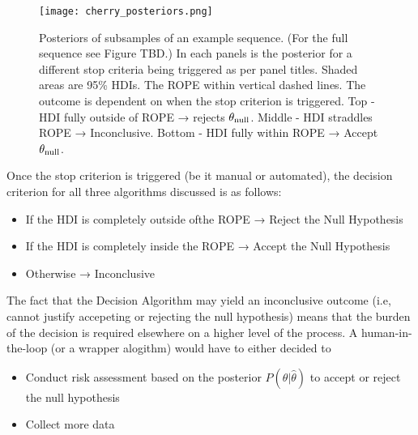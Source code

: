\begin{figure}[h!]
    \centering
    \texttt{[image: cherry\_posteriors.png]}
    \caption{Posteriors of subsamples of an example sequence. (For the full sequence see Figure TBD.)
    In each panels is the posterior for a different stop criteria being triggered as per panel titles.
    Shaded areas are 95\% HDIs. The ROPE within vertical dashed lines.
    The outcome is dependent on when the stop criterion is triggered.
    Top - HDI fully outside of ROPE → rejects $\theta_{\rm null}$.
    Middle - HDI straddles ROPE → Inconclusive.
    Bottom - HDI fully within ROPE → Accept $\theta_{\rm null}$.
    }
    \label{fig:posteriors}
\end{figure}

Once the stop criterion is triggered (be it manual or automated),
the decision criterion for all three algorithms discussed is as follows:

\begin{itemize}
    \item If the HDI is completely outside ofthe ROPE → Reject the Null Hypothesis
    \item If the HDI is completely inside the ROPE → Accept the Null Hypothesis
    \item Otherwise → Inconclusive
\end{itemize}

The fact that the Decision Algorithm may yield an inconclusive outcome
(i.e, cannot justify accepeting or rejecting the null hypothesis) means that the
burden of the decision is required elsewhere on a higher level of the process.
A human-in-the-loop (or a wrapper alogithm) would have to either decided to

\begin{itemize}
    \item Conduct risk assessment based on the posterior $P(\theta|\hat\theta)$ to
    accept or reject the null hypothesis
    \item Collect more data
\end{itemize}

